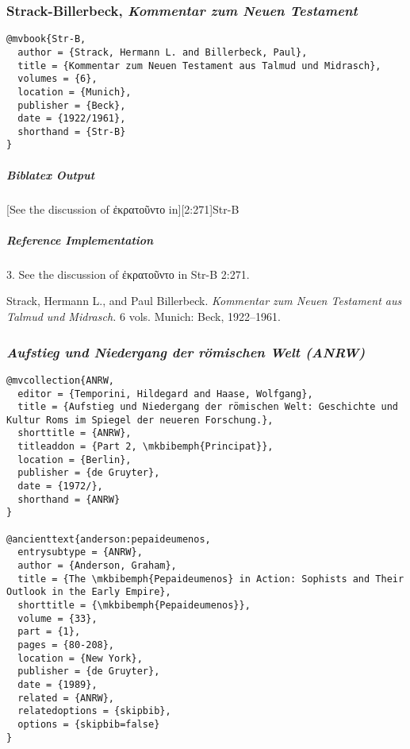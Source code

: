 \documentclass[a4paper]{article}
\newcommand{\textgreek}[1]{{\greekfont #1}}
\newenvironment{biboutput}{%
  \subparagraph{Biblatex Output}
}{\color{black}}
\newenvironment{refimp}{%
  \subparagraph{Reference Implementation}
  \color{reference-colour}
  \rm
}{\par\color{black}}
\begin{document}
\subsubsection{Strack-Billerbeck, \emph{Kommentar zum Neuen Testament}}

\begin{lstlisting}
@mvbook{Str-B,
  author = {Strack, Hermann L. and Billerbeck, Paul},
  title = {Kommentar zum Neuen Testament aus Talmud und Midrasch},
  volumes = {6},
  location = {Munich},
  publisher = {Beck},
  date = {1922/1961},
  shorthand = {Str-B}
}
\end{lstlisting}

\begin{biboutput}
  [See the discussion of \textgreek{ἐκρατοῦντο} in][2:271]{Str-B}
\end{biboutput}

\begin{refimp}
  \hspace*{\bibindent}3. See the discussion of \textgreek{ἐκρατοῦντο} in Str-B
  2:271.

  \hangindent\bibindent Strack, Hermann L., and Paul Billerbeck.
  \emph{Kommentar zum Neuen Testament aus Talmud und Midrasch.} 6 vols.
  Munich: Beck, 1922–1961.

  \sloppy{}
\end{refimp}

\subsubsection{\emph{Aufstieg und Niedergang der römischen Welt (ANRW)}}

\begin{lstlisting}
@mvcollection{ANRW,
  editor = {Temporini, Hildegard and Haase, Wolfgang},
  title = {Aufstieg und Niedergang der römischen Welt: Geschichte und Kultur Roms im Spiegel der neueren Forschung.},
  shorttitle = {ANRW},
  titleaddon = {Part 2, \mkbibemph{Principat}},
  location = {Berlin},
  publisher = {de Gruyter},
  date = {1972/},
  shorthand = {ANRW}
}

@ancienttext{anderson:pepaideumenos,
  entrysubtype = {ANRW},
  author = {Anderson, Graham},
  title = {The \mkbibemph{Pepaideumenos} in Action: Sophists and Their Outlook in the Early Empire},
  shorttitle = {\mkbibemph{Pepaideumenos}},
  volume = {33},
  part = {1},
  pages = {80-208},
  location = {New York},
  publisher = {de Gruyter},
  date = {1989},
  related = {ANRW},
  relatedoptions = {skipbib},
  options = {skipbib=false}
}
\end{lstlisting}
\end{document}
